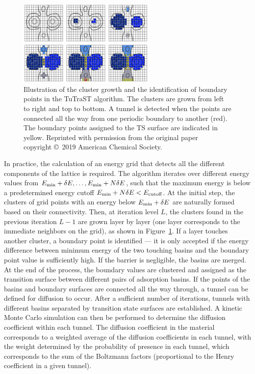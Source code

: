 \documentclass[main]{subfiles}
\begin{document}
\begin{figure}[ht]
  \centering
    \includegraphics[width=0.6\textwidth]{figures/5-diffusion/tutrast.jpg}
    \caption{ Illustration of the cluster growth and the identification of boundary points in the TuTraST algorithm\autocite{Mace_2019}. The clusters are grown from left to right and top to bottom. A tunnel is detected when the points are connected all the way from one periodic boundary to another (red). The boundary points assigned to the TS surface are indicated in yellow. Reprinted with permission from the original paper~\cite{Mace_2019} copyright \copyright\ 2019 American Chemical Society. }\label{fgr:tutrast}
\end{figure}

In practice, the calculation of an energy grid that detects all the different components of the lattice is required. The algorithm iterates over different energy values from $E_{\text{min}}+\delta E, \ldots, E_{\text{min}}+N\delta E$, such that the maximum energy is below a predetermined energy cutoff $E_{\text{min}}+N\delta E<E_{\text{cutoff}}$. At the initial step, the clusters of grid points with an energy below $E_{\text{min}}+\delta E$ are naturally formed based on their connectivity. Then, at iteration level $L$, the clusters found in the previous iteration $L-1$ are grown layer by layer (one layer corresponds to the immediate neighbors on the grid), as shown in Figure~\ref{fgr:tutrast}. If a layer touches another cluster, a boundary point is identified --- it is only accepted if the energy difference between minimum energy of the two touching basins and the boundary point value is sufficiently high. If the barrier is negligible, the basins are merged. At the end of the process, the boundary values are clustered and assigned as the transition surface between different pairs of adsorption basins. If the points of the basins and boundary surfaces are connected all the way through, a tunnel can be defined for diffusion to occur. After a sufficient number of iterations, tunnels with different basins separated by transition state surfaces are established. A kinetic Monte Carlo simulation can then be performed to determine the diffusion coefficient within each tunnel. The diffusion coefficient in the material corresponds to a weighted average of the diffusion coefficients in each tunnel, with the weight determined by the probability of presence in each tunnel, which corresponds to the sum of the Boltzmann factors (proportional to the Henry coefficient in a given tunnel).
\end{document}
